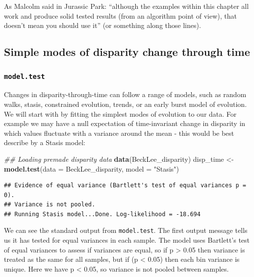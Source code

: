 \documentclass[]{book}
\newenvironment{Shaded}{\begin{snugshade}}{\end{snugshade}}
\newcommand{\CommentTok}[1]{\textcolor[rgb]{0.56,0.35,0.01}{\textit{#1}}}
\newcommand{\DataTypeTok}[1]{\textcolor[rgb]{0.13,0.29,0.53}{#1}}
\newcommand{\KeywordTok}[1]{\textcolor[rgb]{0.13,0.29,0.53}{\textbf{#1}}}
\newcommand{\NormalTok}[1]{#1}
\newcommand{\StringTok}[1]{\textcolor[rgb]{0.31,0.60,0.02}{#1}}
\begin{document}
As Malcolm said in Jurassic Park: ``although the examples within this chapter all work and produce solid tested results (from an algorithm point of view), that doesn't mean you should use it'' (or something along those lines).

\hypertarget{simple-modes-of-disparity-change-through-time}{%
\subsection{Simple modes of disparity change through time}\label{simple-modes-of-disparity-change-through-time}}

\hypertarget{model.test}{%
\subsubsection{\texorpdfstring{\texttt{model.test}}{model.test}}\label{model.test}}

Changes in disparity-through-time can follow a range of models, such as random walks, stasis, constrained evolution, trends, or an early burst model of evolution.
We will start with by fitting the simplest modes of evolution to our data.
For example we may have a null expectation of time-invariant change in disparity in which values fluctuate with a variance around the mean - this would be best describe by a Stasis model:

\begin{Shaded}
\begin{Highlighting}[]
\CommentTok{## Loading premade disparity data}
\KeywordTok{data}\NormalTok{(BeckLee_disparity)}
\NormalTok{disp_time <-}\StringTok{ }\KeywordTok{model.test}\NormalTok{(}\DataTypeTok{data =}\NormalTok{ BeckLee_disparity, }\DataTypeTok{model =} \StringTok{"Stasis"}\NormalTok{)}
\end{Highlighting}
\end{Shaded}

\begin{verbatim}
## Evidence of equal variance (Bartlett's test of equal variances p = 0).
## Variance is not pooled.
## Running Stasis model...Done. Log-likelihood = -18.694
\end{verbatim}

We can see the standard output from \texttt{model.test}.
The first output message tells us it has tested for equal variances in each sample.
The model uses Bartlett's test of equal variances to assess if variances are equal, so if p \textgreater{} 0.05 then variance is treated as the same for all samples, but if (p \textless{} 0.05) then each bin variance is unique.
Here we have p \textless{} 0.05, so variance is not pooled between samples.
\end{document}
